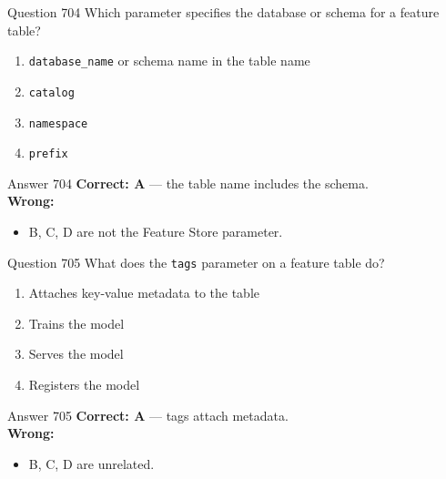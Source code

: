 \documentclass[aspectratio=169,11pt]{beamer}
\begin{document}
	\begin{frame}{Question 704}
		Which parameter specifies the database or schema for a feature table?
		\begin{enumerate}[label=\Alph*.]
			\item \texttt{database\_name} or schema name in the table name
			\item \texttt{catalog}
			\item \texttt{namespace}
			\item \texttt{prefix}
		\end{enumerate}
	\end{frame}
	\begin{frame}{Answer 704}
		\textbf{Correct: A} --- the table name includes the schema.\\
		\vspace{0.5em}
		\textbf{Wrong:}
		\begin{itemize}
			\item B, C, D are not the Feature Store parameter.
		\end{itemize}
	\end{frame}
	
	\begin{frame}{Question 705}
		What does the \texttt{tags} parameter on a feature table do?
		\begin{enumerate}[label=\Alph*.]
			\item Attaches key-value metadata to the table
			\item Trains the model
			\item Serves the model
			\item Registers the model
		\end{enumerate}
	\end{frame}
	\begin{frame}{Answer 705}
		\textbf{Correct: A} --- tags attach metadata.\\
		\vspace{0.5em}
		\textbf{Wrong:}
		\begin{itemize}
			\item B, C, D are unrelated.
		\end{itemize}
	\end{frame}
	
\end{document}
